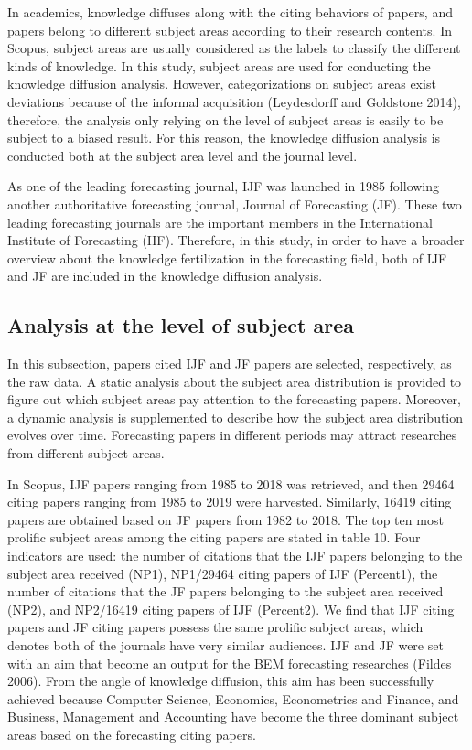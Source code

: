 \documentclass[11pt,a4paper]{elsarticle} %
\begin{document}
In academics, knowledge diffuses along with the citing behaviors of
papers, and papers belong to different subject areas according to their
research contents. In Scopus, subject areas are usually considered as
the labels to classify the different kinds of knowledge. In this study,
subject areas are used for conducting the knowledge diffusion analysis.
However, categorizations on subject areas exist deviations because of
the informal acquisition (Leydesdorff and Goldstone 2014), therefore,
the analysis only relying on the level of subject areas is easily to be
subject to a biased result. For this reason, the knowledge diffusion
analysis is conducted both at the subject area level and the journal
level.

As one of the leading forecasting journal, IJF was launched in 1985
following another authoritative forecasting journal, Journal of
Forecasting (JF). These two leading forecasting journals are the
important members in the International Institute of Forecasting (IIF).
Therefore, in this study, in order to have a broader overview about the
knowledge fertilization in the forecasting field, both of IJF and JF are
included in the knowledge diffusion analysis.

\subsection{Analysis at the level of subject
area}\label{analysis-at-the-level-of-subject-area}

In this subsection, papers cited IJF and JF papers are selected,
respectively, as the raw data. A static analysis about the subject area
distribution is provided to figure out which subject areas pay attention
to the forecasting papers. Moreover, a dynamic analysis is supplemented
to describe how the subject area distribution evolves over time.
Forecasting papers in different periods may attract researches from
different subject areas.

In Scopus, IJF papers ranging from 1985 to 2018 was retrieved, and then
29464 citing papers ranging from 1985 to 2019 were harvested. Similarly,
16419 citing papers are obtained based on JF papers from 1982 to 2018.
The top ten most prolific subject areas among the citing papers are
stated in table 10. Four indicators are used: the number of citations
that the IJF papers belonging to the subject area received (NP1),
NP1/29464 citing papers of IJF (Percent1), the number of citations that
the JF papers belonging to the subject area received (NP2), and
NP2/16419 citing papers of IJF (Percent2). We find that IJF citing
papers and JF citing papers possess the same prolific subject areas,
which denotes both of the journals have very similar audiences. IJF and
JF were set with an aim that become an output for the BEM forecasting
researches (Fildes 2006). From the angle of knowledge diffusion, this
aim has been successfully achieved because Computer Science, Economics,
Econometrics and Finance, and Business, Management and Accounting have
become the three dominant subject areas based on the forecasting citing
papers.
\end{document}

